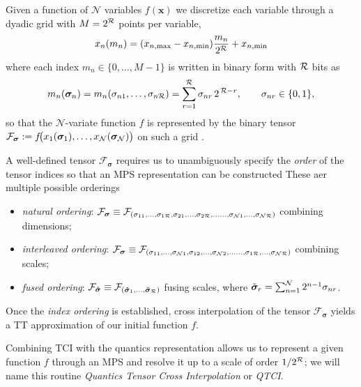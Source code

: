 Given a function of $\mathcal{N}$ variables $f(\boldsymbol{x})$ we discretize each variable through a dyadic grid with \(M=2^{\mathcal{R}}\) points per variable, 
\begin{equation}
	x_n(m_n) = (x_{n,\text{max}} - x_{n,\text{min}})\frac{m_n}{2^{\mathcal{R}}} + x_{n,\text{min}}
	\label{eq:quanticsGrid}
\end{equation}
where each index \(m_n\in\{0,\dots,M-1\}\) is written in binary form with $\mathcal{R}$ bits as 
\begin{equation}
	m_n(\boldsymbol{\sigma}_n)  = m_n(\sigma_{n1},\dots,\sigma_{n\mathcal{R}})=\sum_{r=1}^{\mathcal{R}}\sigma_{nr}\,2^{\,\mathcal{R}-r},\quad 
\quad \sigma_{nr}\in\{0,1\},
\label{eq:quanticsRepr}
\end{equation}
so that the \(\mathcal{N}\)-variate function \(f\) is represented by the binary tensor \(\mathcal{F}_{\boldsymbol{\sigma}}:=f\!\bigl(x_1(\boldsymbol{\sigma}_1),\dots,x_{\mathcal{N}}(\boldsymbol{\sigma}_{\mathcal{N}})\bigr)\) on such a grid \cite{Khoromskij2011, Hiroshi2023}.

A well-defined tensor \(\mathcal{F}_{\boldsymbol{\sigma}}\) requires us to unambiguously specify the \textit{order} of the tensor indices so that an MPS representation can be constructed These aer multiple possible orderings
\begin{itemize}
	\item \textit{natural ordering}: $\mathcal{F}_{\boldsymbol{\sigma}} \equiv \mathcal{F}_{(\sigma_{11},\dots,\sigma_{1\mathcal{R}},\sigma_{21},\dots,\sigma_{2\mathcal{R}}, \dots\dots,\sigma_{\mathcal{N}1},\dots,\sigma_{\mathcal{N}\mathcal{R}})}$ combining dimensions;
	\item \textit{interleaved ordering}: $\mathcal{F}_{\boldsymbol{\sigma}} \equiv \mathcal{F}_{(\sigma_{11},\dots,\sigma_{\mathcal{N}1},\sigma_{12},\dots,\sigma_{\mathcal{N}2}, \dots\dots,\sigma_{1\mathcal{R}},\dots,\sigma_{\mathcal{N}\mathcal{R}})}$ combining scales;
	\item \textit{fused ordering}: $\mathcal{F}_{\tilde {\boldsymbol{\sigma}}} \equiv \mathcal{F}_{({\tilde {\boldsymbol{\sigma}}}_{1},\dots,{\tilde {\boldsymbol{\sigma}}}_{\mathcal{R}})}$ fusing scales, where ${\tilde {\boldsymbol{\sigma}}}_r = \sum_{n=1}^{\mathcal{N}} 2^{n-1}\sigma_{nr}$.
\end{itemize} 
Once the \textit{index ordering} is established, cross interpolation of the tensor \(\mathcal{F}_{\boldsymbol{\sigma}}\) yields a TT approximation of our initial function $f$. 

Combining TCI with the quantics representation allows us to represent a given function $f$ through an MPS and resolve it up to a scale of order $1/2^{\mathcal{R}}$; we will name this routine \textit{Quantics Tensor Cross Interpolation} or \textit{QTCI}. 

